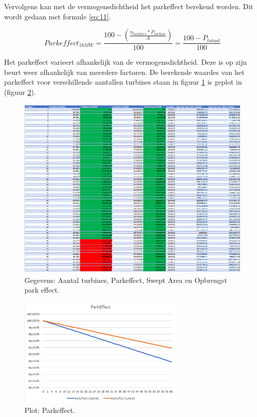 Vervolgens kan met de vermogensdichtheid het parkeffect berekend worden. Dit wordt gedaan met formule \ref{eq:11}. 

\begin{equation} \label{eq:11}
 Parkeffect_{18MW}=\frac{100-(\frac{n_{turbines}*P_{turbine}}{A})}{100} = \frac{100-P_{totaal}}{100}
\end{equation}

Het parkeffect varieert afhankelijk van de vermogensdichtheid. Deze is op zijn beurt weer afhankelijk van meerdere factoren. De berekende waardes van het parkeffect voor verschillende aantallen turbines staan in figuur \ref{fig:Parkeffect_table} is geplot in (figuur \ref{fig:ParkEffectGraph}). 

\begin{figure}[H]
\centering
\includegraphics[width=1\textwidth]{IMG/data/overzicht/Parkeffect.PNG}
\caption{Gegevens: Aantal turbines, Parkeffect, Swept Area en Opbrengst park effect.}
\label{fig:Parkeffect_table}
\end{figure}

\begin{figure}[H]
\centering
\includegraphics[width=0.7\textwidth]{IMG/data/overzicht/parkeffect_graph.PNG}
\caption{Plot: Parkeffect.}
\label{fig:ParkEffectGraph}
\end{figure}

